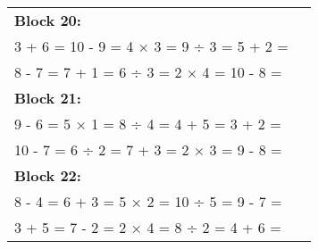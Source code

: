 \documentclass[a4paper,12pt]{scrartcl}
\begin{document}
\begin{adjustbox}{center, valign=c}
\begin{tabular}{@{}p{0.95\linewidth}@{}}
\textbf{Block 20:}\\
3 + 6 = \hfill 10 - 9 = \hfill 4 × 3 = \hfill 9 ÷ 3 = \hfill 5 + 2 =\\
8 - 7 = \hfill 7 + 1 = \hfill 6 ÷ 3 = \hfill 2 × 4 = \hfill 10 - 8 =\\[0.6em]

\textbf{Block 21:}\\
9 - 6 = \hfill 5 × 1 = \hfill 8 ÷ 4 = \hfill 4 + 5 = \hfill 3 + 2 =\\
10 - 7 = \hfill 6 ÷ 2 = \hfill 7 + 3 = \hfill 2 × 3 = \hfill 9 - 8 =\\[0.6em]

\textbf{Block 22:}\\
8 - 4 = \hfill 6 + 3 = \hfill 5 × 2 = \hfill 10 ÷ 5 = \hfill 9 - 7 =\\
3 + 5 = \hfill 7 - 2 = \hfill 2 × 4 = \hfill 8 ÷ 2 = \hfill 4 + 6 =\\[0.6em]

\end{tabular}
\end{adjustbox}
\end{document}
